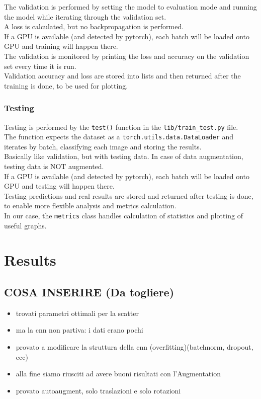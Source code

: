 \documentclass{report}
\begin{document}
The validation is performed by setting the model to evaluation mode and running the model while iterating through the validation set. \\
A loss is calculated, but no backpropagation is performed.\\
If a GPU is available (and detected by pytorch), each batch will be loaded onto GPU and training will happen there. \\

The validation is monitored by printing the loss and accuracy on the validation set every time it is run. \\
Validation accuracy and loss are stored into lists and then returned after the training is done, to be used for plotting. \\
\subsection{Testing}
Testing is performed by the \texttt{test()} function in the \texttt{lib/train\_test.py} file. \\
The function expects the dataset as a \texttt{torch.utils.data.DataLoader} and iterates by batch, classifying each image and storing the results. \\
Basically like validation, but with testing data. In case of data augmentation, testing data is NOT augmented.\\

If a GPU is available (and detected by pytorch), each batch will be loaded onto GPU and testing will happen there. \\

Testing predictions and real results are stored and returned after testing is done, to enable more flexible analysis and metrics calculation.\\
In our case, the \texttt{metrics} class handles calculation of statistics and plotting of useful graphs.\\

\chapter{Results}
\section{COSA INSERIRE (Da togliere)}
\begin{itemize}
  \item trovati parametri ottimali per la scatter
  \item ma la cnn non partiva: i dati erano pochi
  \item provato a modificare la struttura della cnn (overfitting)(batchnorm, dropout, ecc)
  \item alla fine siamo riusciti ad avere buoni risultati con l'Augmentation
  \item provato autoaugment, solo traslazioni e solo rotazioni
\end{itemize}
\end{document}
